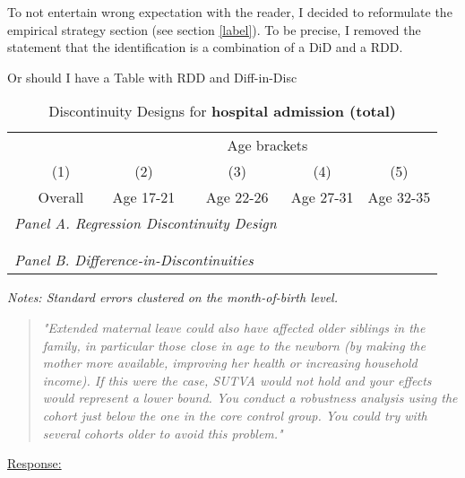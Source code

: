 To not entertain wrong expectation with the reader, I decided to reformulate the empirical strategy section (see section \ref{label}). To be precise, I removed 
the statement that the identification is a combination of a DiD and a RDD. 





Or should I have a Table with RDD and Diff-in-Disc
\begin{table}[H] \centering 
	\begin{threeparttable} \centering \caption{Discontinuity Designs for \textbf{hospital admission (total)}}\label{tab_mlch: revision_RDD_DiffDisc_hopsital2_total}
		{\def\sym#1{\ifmmode^{#1}\else\(^{#1}\)\fi} 
			\begin{tabular}{l*{5}{c}}
				\toprule 
				& & \multicolumn{4}{c}{Age brackets} \\ 
				\cmidrule(lr){3-6}
				&\multicolumn{1}{c}{(1)}&\multicolumn{1}{c}{(2)}&\multicolumn{1}{c}{(3)}&\multicolumn{1}{c}{(4)}&\multicolumn{1}{c}{(5)}\\
				&\multicolumn{1}{c}{Overall}&\multicolumn{1}{c}{Age 17-21}&\multicolumn{1}{c}{Age 22-26}&\multicolumn{1}{c}{Age 27-31} &\multicolumn{1}{c}{Age 32-35}\\
				\midrule
				\multicolumn{4}{l}{\emph{Panel A. Regression Discontinuity Design}} \\
				 \\ \\
				
				\multicolumn{4}{l}{\emph{Panel B. Difference-in-Discontinuities}} \\
				 
				\bottomrule 
		\end{tabular}}
		\begin{tablenotes} 
			\item \scriptsize \emph{Notes: Standard errors clustered on the month-of-birth level.} 
		\end{tablenotes} 
	\end{threeparttable} 
\end{table}






\bigskip
\begin{quote}
	\textit{"Extended maternal leave could also have affected older siblings in the family, in particular those close in age to the newborn (by making the mother more available, improving her health or increasing household income). If this were the case, SUTVA would not hold and your effects would represent a lower bound. You conduct a robustness analysis using the cohort just below the one in the core control group. You could try with several cohorts older to avoid this problem."}
\end{quote}
\underline{Response:}


